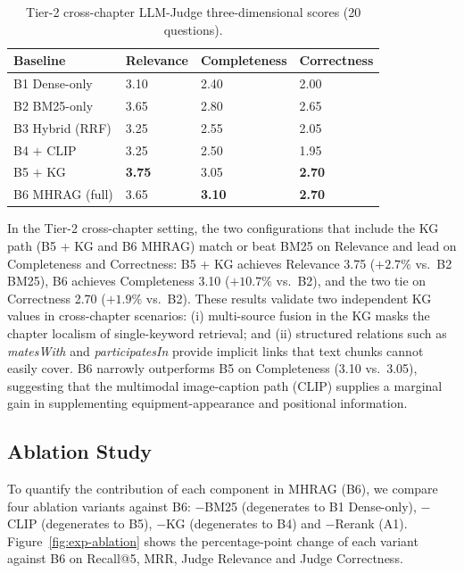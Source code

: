 \documentclass[applsci,article,submit,pdftex,moreauthors]{Definitions/mdpi}
\begin{document}
\begin{table}[H]
\caption{Tier-2 cross-chapter LLM-Judge three-dimensional scores (20 questions).\label{tab:exp-tier2}}
\begin{tabularx}{\textwidth}{lYYY}
\toprule
\textbf{Baseline} & Relevance & Completeness & Correctness\\
\midrule
B1 Dense-only       & 3.10 & 2.40 & 2.00\\
B2 BM25-only        & 3.65 & 2.80 & 2.65\\
B3 Hybrid (RRF)     & 3.25 & 2.55 & 2.05\\
B4 $+$ CLIP         & 3.25 & 2.50 & 1.95\\
B5 $+$ KG           & \textbf{3.75} & 3.05 & \textbf{2.70}\\
B6 MHRAG (full)     & 3.65 & \textbf{3.10} & \textbf{2.70}\\
\bottomrule
\end{tabularx}
\end{table}

In the Tier-2 cross-chapter setting, the two configurations that include the KG path (B5 + KG and B6 MHRAG) match or beat BM25 on Relevance and lead on Completeness and Correctness: B5 + KG achieves Relevance 3.75 (${+}2.7\%$ vs.\ B2 BM25), B6 achieves Completeness 3.10 (${+}10.7\%$ vs.\ B2), and the two tie on Correctness 2.70 (${+}1.9\%$ vs.\ B2). These results validate two independent KG values in cross-chapter scenarios: (i) multi-source fusion in the KG masks the chapter localism of single-keyword retrieval; and (ii) structured relations such as \textit{matesWith} and \textit{participatesIn} provide implicit links that text chunks cannot easily cover. B6 narrowly outperforms B5 on Completeness (3.10 vs.\ 3.05), suggesting that the multimodal image-caption path (CLIP) supplies a marginal gain in supplementing equipment-appearance and positional information.

\subsection{Ablation Study}
\label{sec:exp-ablation}

To quantify the contribution of each component in MHRAG (B6), we compare four ablation variants against B6: $-$BM25 (degenerates to B1 Dense-only), $-$CLIP (degenerates to B5), $-$KG (degenerates to B4) and $-$Rerank (A1). Figure~\ref{fig:exp-ablation} shows the percentage-point change of each variant against B6 on Recall@5, MRR, Judge Relevance and Judge Correctness.
\end{document}
